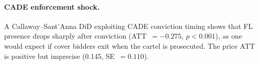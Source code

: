\paragraph{CADE enforcement shock.}
A Callaway--Sant'Anna DiD exploiting CADE conviction timing shows that
FL presence drops sharply after conviction (ATT~$= -0.275$,
$p < 0.001$), as one would expect if cover bidders exit when the
cartel is prosecuted. The price ATT is positive but imprecise (0.145,
SE~$= 0.110$).
